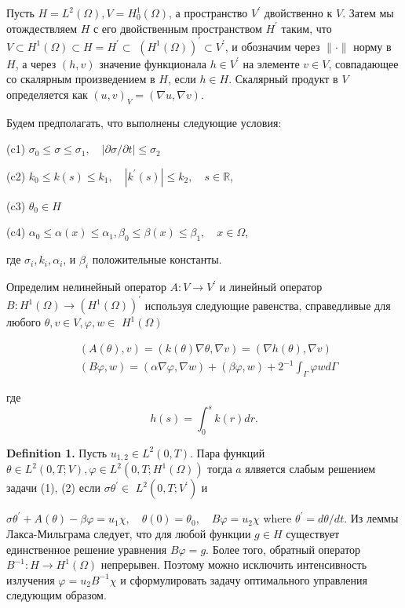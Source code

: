 \documentclass[10pt]{article}
\begin{document}
Пусть $H=L^{2}(\Omega), V=H_{0}^{1}(\Omega)$, а пространство $V^{\prime}$ двойственно к $V$.
Затем мы отождествляем $H$ с его двойственным пространством $H^{\prime}$ таким,
что $V \subset H^{1}(\Omega) \subset H=H^{\prime} \subset$
$\left( H^{1}(\Omega)\right)^{\prime} \subset V^{\prime}$,
и обозначим через $\|\cdot\|$ норму в $H$,
а через $(h , v)$ значение функционала $h \in V^{\prime}$
на элементе $v \in V$, совпадающее со скалярным произведением в $H$, если $h \in H$.
Скалярный продукт в $V$ определяется как $(u, v)_{V}=(\nabla u, \nabla v)$.


Будем предполагать, что выполнены следующие условия:

(c1) $\sigma_{0} \leq \sigma \leq \sigma_{1}, \quad|\partial \sigma / \partial t| \leq \sigma_{2}$

(c2) $k_{0} \leq k(s) \leq k_{1}, \quad\left|k^{\prime}(s)\right| \leq k_{2}, \quad s \in \mathbb{R}$,

(c3) $\theta_{0} \in H$

(c4) $\alpha_{0} \leq \alpha(x) \leq \alpha_{1}, \beta_{0} \leq \beta(x) \leq \beta_{1}, \quad x \in \Omega$,

где $\sigma_{i}, k_{i}, \alpha_{i}$, и $\beta_{i}$ положительные константы.

Определим нелинейный оператор $A: V \rightarrow V^{\prime}$ и линейный оператор
$B: H^{1}(\Omega) \rightarrow\left(H^{1}(\Omega)\right)^{\prime}$
используя следующие равенства, справедливые для любого
 $\theta, v \in V, \varphi, w \in$ $H^{1}(\Omega)$

\[
\begin{aligned}
&(A(\theta), v)=(k(\theta) \nabla \theta, \nabla v)=(\nabla h(\theta), \nabla v) \\
&(B \varphi, w)=(\alpha \nabla \varphi, \nabla w)+(\beta \varphi, w)+2^{-1}
\int_{\Gamma} \varphi w d \Gamma
\end{aligned}
\]

где
\[
h(s)=\int_{0}^{s} k(r) d r .
\]

\textbf{Definition 1.} Пусть $u_{1,2} \in L^{2}(0, T)$.
Пара функций $\theta \in L^{2}(0, T ; V), \varphi \in L^{2}\left(0, T ; H^{1}(\Omega)\right)$
тогда $a$ ялвяется слабым решением задачи (1), (2)
если $\sigma \theta^{\prime} \in$ $L^{2}\left(0, T ; V^{\prime}\right)$ и

$\sigma \theta^{\prime}+A(\theta)-\beta \varphi=u_{1} \chi, \quad \theta(0)=\theta_{0},
\quad B \varphi=u_{2} \chi$ where $\theta^{\prime}=d \theta / d t$.
Из леммы Лакса-Мильграма следует, что для любой функции $g \in H$ существует единственное
решение уравнения $B \varphi=g$.
Более того, обратный оператор $B^{-1}: H \rightarrow H^{1}(\Omega)$ непрерывен.
Поэтому можно исключить интенсивность излучения $\varphi=u_{2} B^{-1} \chi$ и
сформулировать задачу оптимального управления следующим образом.
\end{document}
